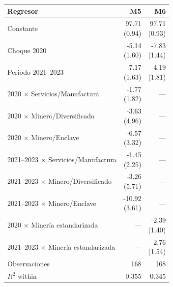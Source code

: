 \begin{tabular}{lrr}
\toprule
Regresor & M5 & M6 \\
\midrule
Constante & \shortstack{97.71 \\ (0.94)} & \shortstack{97.71 \\ (0.93)} \\
Choque 2020 & \shortstack{-5.14 \\ (1.60)} & \shortstack{-7.83 \\ (1.44)} \\
Periodo 2021--2023 & \shortstack{7.17 \\ (1.63)} & \shortstack{4.19 \\ (1.81)} \\
2020 $\times$ Servicios/Manufactura & \shortstack{-1.77 \\ (1.82)} & --- \\
2020 $\times$ Minero/Diversificado & \shortstack{-3.63 \\ (4.96)} & --- \\
2020 $\times$ Minero/Enclave & \shortstack{-6.57 \\ (3.32)} & --- \\
2021--2023 $\times$ Servicios/Manufactura & \shortstack{-1.45 \\ (2.25)} & --- \\
2021--2023 $\times$ Minero/Diversificado & \shortstack{-3.26 \\ (5.71)} & --- \\
2021--2023 $\times$ Minero/Enclave & \shortstack{-10.92 \\ (3.61)} & --- \\
2020 $\times$ Minería estandarizada & --- & \shortstack{-2.39 \\ (1.40)} \\
2021--2023 $\times$ Minería estandarizada & --- & \shortstack{-2.76 \\ (1.54)} \\
Observaciones & 168 & 168 \\
$R^2$ within & 0.355 & 0.345 \\
\bottomrule
\end{tabular}

